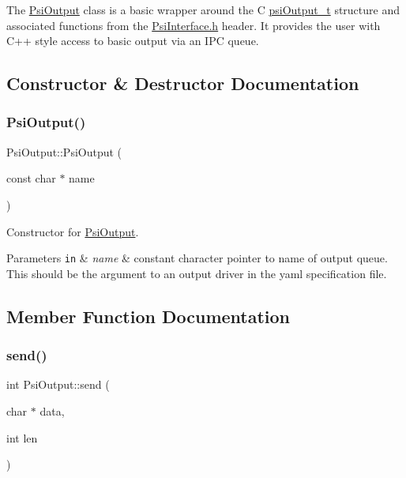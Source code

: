The \hyperlink{classPsiOutput}{Psi\+Output} class is a basic wrapper around the C \hyperlink{structpsiOutput__t}{psi\+Output\+\_\+t} structure and associated functions from the \hyperlink{PsiInterface_8h_source}{Psi\+Interface.\+h} header. It provides the user with C++ style access to basic output via an I\+PC queue. 

\subsection{Constructor \& Destructor Documentation}
\mbox{\label{classPsiOutput_a40a8752bfc87e83bb9671b737f7506aa}} 
\subsubsection{\texorpdfstring{Psi\+Output()}{PsiOutput()}}
{\footnotesize\ttfamily Psi\+Output\+::\+Psi\+Output (\begin{DoxyParamCaption}\item[{const char $\ast$}]{name }\end{DoxyParamCaption})\hspace{0.3cm}{\ttfamily [inline]}}



Constructor for \hyperlink{classPsiOutput}{Psi\+Output}. 


\begin{DoxyParams}[1]{Parameters}
\mbox{\tt in}  & {\em name} & constant character pointer to name of output queue. This should be the argument to an output driver in the yaml specification file. \\
\hline
\end{DoxyParams}


\subsection{Member Function Documentation}
\mbox{\label{classPsiOutput_a5cdad4b95c12f7ac7dcc8c4a7e7c8104}} 
\subsubsection{\texorpdfstring{send()}{send()}}
{\footnotesize\ttfamily int Psi\+Output\+::send (\begin{DoxyParamCaption}\item[{char $\ast$}]{data,  }\item[{int}]{len }\end{DoxyParamCaption})\hspace{0.3cm}{\ttfamily [inline]}}



